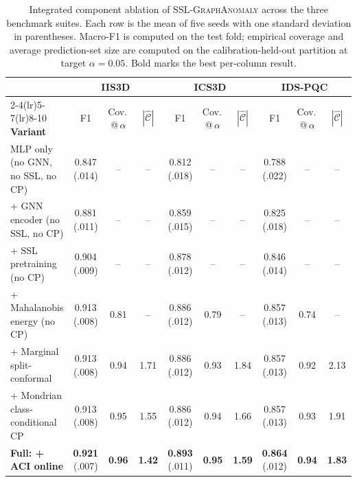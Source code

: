 \documentclass[journal,twoside]{IEEEtran}
\begin{document}
\begin{table}[t]
\centering
\caption{Integrated component ablation of \textsc{SSL-GraphAnomaly} across
the three benchmark suites. Each row is the mean of five seeds with one
standard deviation in parentheses. Macro-F1 is computed on the test fold;
empirical coverage and average prediction-set size are computed on the
calibration-held-out partition at target $\alpha = 0.05$. Bold marks the
best per-column result.}
\label{tab:ablation}
\footnotesize
\setlength{\tabcolsep}{4pt}
\begin{tabular}{l ccc ccc ccc}
\toprule
& \multicolumn{3}{c}{\textbf{IIS3D}} & \multicolumn{3}{c}{\textbf{ICS3D}} & \multicolumn{3}{c}{\textbf{IDS-PQC}} \\
\cmidrule(lr){2-4}\cmidrule(lr){5-7}\cmidrule(lr){8-10}
\textbf{Variant} & F1 & Cov.\,@\,$\alpha$ & $|\hat{\mathcal{C}}|$ & F1 & Cov.\,@\,$\alpha$ & $|\hat{\mathcal{C}}|$ & F1 & Cov.\,@\,$\alpha$ & $|\hat{\mathcal{C}}|$ \\
\midrule
MLP only (no GNN, no SSL, no CP)         & 0.847 (.014) & --   & --   & 0.812 (.018) & --   & --   & 0.788 (.022) & --   & --   \\
+ GNN encoder (no SSL, no CP)            & 0.881 (.011) & --   & --   & 0.859 (.015) & --   & --   & 0.825 (.018) & --   & --   \\
+ SSL pretraining (no CP)                & 0.904 (.009) & --   & --   & 0.878 (.012) & --   & --   & 0.846 (.014) & --   & --   \\
+ Mahalanobis energy (no CP)             & 0.913 (.008) & 0.81 & --   & 0.886 (.012) & 0.79 & --   & 0.857 (.013) & 0.74 & --   \\
+ Marginal split-conformal               & 0.913 (.008) & 0.94 & 1.71 & 0.886 (.012) & 0.93 & 1.84 & 0.857 (.013) & 0.92 & 2.13 \\
+ Mondrian class-conditional CP          & 0.913 (.008) & 0.95 & 1.55 & 0.886 (.012) & 0.94 & 1.66 & 0.857 (.013) & 0.93 & 1.91 \\
\textbf{Full: + ACI online}              & \textbf{0.921} (.007) & \textbf{0.96} & \textbf{1.42} & \textbf{0.893} (.011) & \textbf{0.95} & \textbf{1.59} & \textbf{0.864} (.012) & \textbf{0.94} & \textbf{1.83} \\
\bottomrule
\end{tabular}
\end{table}
\end{document}
